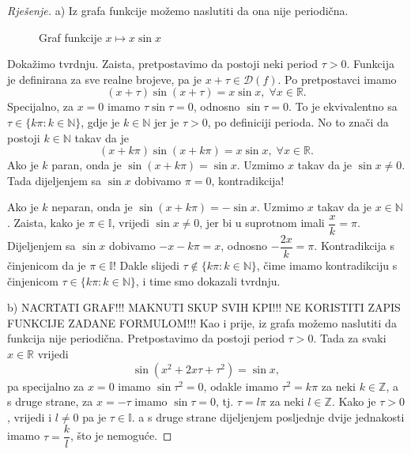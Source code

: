 \begin{proof}[Rješenje]
a) Iz grafa funkcije možemo naslutiti da ona nije periodična.
\begin{figure}[ht]
\begin{center}
\end{center}
\caption{\label{gr6} Graf funkcije \(x\mapsto x\sin{x}\)}
\end{figure}

Dokažimo tvrdnju. Zaista, pretpostavimo da postoji neki period \(\tau>0\). Funkcija je definirana za sve realne brojeve, pa je \(x+\tau\in \mathcal{D}(f)\). Po pretpostavci imamo \[(x+\tau)\sin(x+\tau)=x\sin{x},\; \forall x\in \mathbb{R}.\] 
Specijalno, za \(x=0\) imamo \(\tau\sin{\tau}=0\), odnosno \(\sin{\tau}=0\). To je ekvivalentno sa \(\tau\in \{k\pi : k\in \mathbb{N}\}\), gdje je \(k\in \mathbb{N}\) jer je \(\tau>0\), po definiciji perioda. No to znači da postoji \(k\in \mathbb{N}\) takav da je \[(x+k\pi)\sin(x+k\pi)=x\sin{x},\;\forall x\in \mathbb{R}.\] Ako je \(k\) paran, onda je \(\sin(x+k\pi)=\sin{x}\). Uzmimo \(x\) takav da je \(\sin{x}\neq 0\). Tada dijeljenjem sa \(\sin{x}\) dobivamo \(\pi=0\), kontradikcija! 

Ako je \(k\) neparan, onda je \(\sin(x+k\pi)=-\sin{x}\). Uzmimo \(x\) takav da je \(x\in \mathbb{N}\). Zaista, kako je \(\pi\in \mathbb{I}\), vrijedi \(\sin{x}\neq 0\), jer bi u suprotnom imali \(\dfrac{x}{k}=\pi\). Dijeljenjem sa \(\sin{x}\) dobivamo \(-x-k\pi=x\), odnosno \(-\dfrac{2x}{k}=\pi\). Kontradikcija s činjenicom da je \(\pi\in \mathbb{I}\)! Dakle slijedi \(\tau\notin \{k\pi : k\in \mathbb{N}\}\), čime imamo kontradikciju s činjenicom \(\tau\in \{k\pi : k\in \mathbb{N}\}\), i time smo dokazali tvrdnju.

b) NACRTATI GRAF!!! MAKNUTI SKUP SVIH KPI!!! NE KORISTITI ZAPIS FUNKCIJE ZADANE FORMULOM!!! Kao i prije, iz grafa možemo naslutiti da funkcija nije periodična. Pretpostavimo da postoji period $\tau>0$. Tada za svaki $x\in \mathbb{R}$ vrijedi $$\sin{\left(x^2+2x\tau+\tau^2\right)}=\sin{x},$$ pa specijalno za $x=0$ imamo $\sin{\tau^2}=0$, odakle imamo $\tau^2=k\pi$ za neki $k\in \mathbb{Z}$, a s druge strane, za $x=-\tau$ imamo $\sin{\tau}=0$, tj. $\tau=l\pi$ za neki $l\in \mathbb{Z}$. Kako je $\tau>0$, vrijedi i $l\neq 0$ pa je $\tau\in \mathbb{I}$. a s druge strane dijeljenjem posljednje dvije jednakosti imamo $\tau=\dfrac{k}{l}$, što je nemoguće.
\end{proof}

